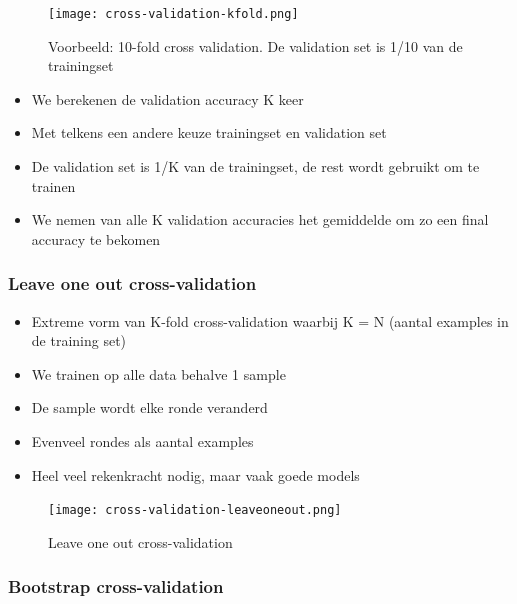 \documentclass{article}
\begin{document}
\begin{figure}[H]
    \centering
    \texttt{[image: cross-validation-kfold.png]}
    \caption{Voorbeeld: 10-fold cross validation. De validation set is 1/10 van de trainingset}
\end{figure}

\begin{itemize}
    \item We berekenen de validation accuracy K keer
    \item Met telkens een andere keuze trainingset en validation set
    \item De validation set is 1/K van de trainingset, de rest wordt gebruikt om te trainen
    \item We nemen van alle K validation accuracies het gemiddelde om zo een final accuracy te bekomen
\end{itemize}

\subsubsection{Leave one out cross-validation}

\begin{itemize}
    \item Extreme vorm van K-fold cross-validation waarbij K = N (aantal examples in de training set)
    \item We trainen op alle data behalve 1 sample
    \item De sample wordt elke ronde veranderd
    \item Evenveel rondes als aantal examples
    \item Heel veel rekenkracht nodig, maar vaak goede models
\end{itemize}

\begin{figure}[H]
    \centering
    \texttt{[image: cross-validation-leaveoneout.png]}
    \caption{Leave one out cross-validation}
\end{figure}

\subsubsection{Bootstrap cross-validation}
\end{document}
